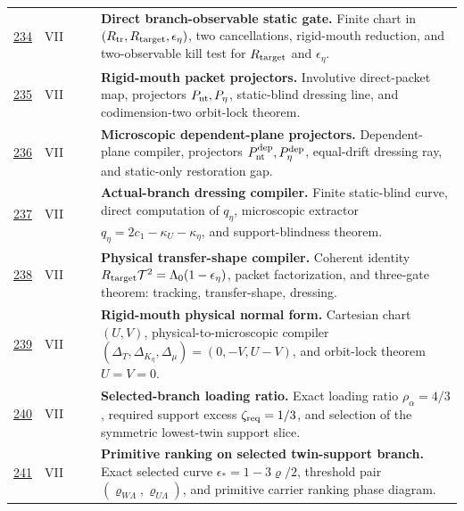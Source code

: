 {\begin{longtable}{@{}L{0.055\textwidth}L{0.075\textwidth}L{0.145\textwidth}L{0.235\textwidth}L{0.43\textwidth}@{}}
\addlinespace
\hyperref[stage:234]{234} & VII &  & \StatusExactClosure{} & \textbf{Direct branch-observable static gate.} Finite chart in \((R_{\rm tr},R_{\rm target},\epsilon_\eta)\), two cancellations, rigid-mouth reduction, and two-observable kill test for \(R_{\rm target}\) and \(\epsilon_\eta\). \\
\addlinespace
\hyperref[stage:235]{235} & VII &  & \StatusExactClosure{} & \textbf{Rigid-mouth packet projectors.} Involutive direct-packet map, projectors \(P_{\rm nt},P_\eta\), static-blind dressing line, and codimension-two orbit-lock theorem. \\
\addlinespace
\hyperref[stage:236]{236} & VII &  & \StatusExactClosure{} & \textbf{Microscopic dependent-plane projectors.} Dependent-plane compiler, projectors \(P_{\rm nt}^{\rm dep},P_\eta^{\rm dep}\), equal-drift dressing ray, and static-only restoration gap. \\
\addlinespace
\hyperref[stage:237]{237} & VII &  & \StatusExactClosure{} & \textbf{Actual-branch dressing compiler.} Finite static-blind curve, direct computation of \(q_\eta\), microscopic extractor \(q_\eta=2c_1-\kappa_U-\kappa_\eta\), and support-blindness theorem. \\
\addlinespace
\hyperref[stage:238]{238} & VII &  & \StatusExactClosure{} & \textbf{Physical transfer-shape compiler.} Coherent identity \(R_{\rm target}\mathcal T^2=\Lambda_0(1-\epsilon_\eta)\), packet factorization, and three-gate theorem: tracking, transfer-shape, dressing. \\
\addlinespace
\hyperref[stage:239]{239} & VII &  & \StatusExactClosure{} & \textbf{Rigid-mouth physical normal form.} Cartesian chart \((U,V)\), physical-to-microscopic compiler \((\Delta_T,\Delta_{K_\eta},\Delta_\mu)=(0,-V,U-V)\), and orbit-lock theorem \(U=V=0\). \\
\addlinespace
\hyperref[stage:240]{240} & VII &  & \StatusExactClosure{} & \textbf{Selected-branch loading ratio.} Exact loading ratio \(\rho_\alpha=4/3\), required support excess \(\zeta_{\rm req}=1/3\), and selection of the symmetric lowest-twin support slice. \\
\addlinespace
\hyperref[stage:241]{241} & VII &  & \StatusExactClosure{} & \textbf{Primitive ranking on selected twin-support branch.} Exact selected curve \(\epsilon_*=1-3\varrho/2\), threshold pair \((\varrho_{W\Lambda},\varrho_{U\Lambda})\), and primitive carrier ranking phase diagram. \\

\end{longtable}}

